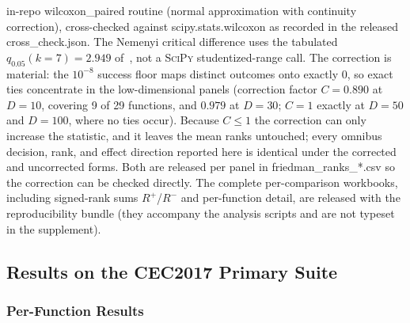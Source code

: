 in-repo wilcoxon\_paired routine (normal approximation with continuity
correction), cross-checked against scipy.stats.wilcoxon as recorded
in the released cross\_check.json. The Nemenyi critical difference uses the tabulated
$q_{0.05}(k = 7) = 2.949$ of~\cite{demsar2006statistical}, not a \textsc{SciPy}
studentized-range call. The correction
is material: the $10^{-8}$ success floor maps distinct outcomes onto
exactly $0$, so exact ties concentrate in the low-dimensional panels
(correction factor $C = 0.890$ at $D = 10$, covering 9 of 29 functions,
and $0.979$ at $D = 30$; $C = 1$ exactly at $D = 50$ and $D = 100$, where
no ties occur). Because $C \le 1$ the correction can only increase the
statistic, and it leaves the mean ranks untouched; every omnibus decision,
rank, and effect direction reported here is identical under the corrected
and uncorrected forms. Both are released per panel in
friedman\_ranks\_*.csv so the correction can be checked directly.
The complete
per-comparison workbooks, including signed-rank sums $R^{+}$/$R^{-}$
and per-function detail, are released with the reproducibility bundle
(they accompany the analysis scripts and are not typeset in the supplement).

\subsection{Results on the CEC2017 Primary Suite}\label{sec:exp:cec2017}

\subsubsection{Per-Function Results}\label{sec:exp:cec2017:desc}

